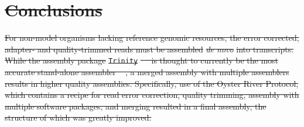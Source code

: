 \documentclass[10pt,letterpaper]{article}
\providecommand{\DIFdeltex}[1]{{\protect\color{red}\sout{#1}}}                      %
\providecommand{\DIFdel}[1]{\texorpdfstring{\DIFdeltex{#1}}{}} %
\begin{document}

\section{\DIFdel{Conclusions}}
\addtocounter{section}{-1}%

\DIFdel{For non-model organisms lacking reference genomic resources, the error corrected, adapter- and quality-trimmed reads must be assembled }\textit{\DIFdel{de novo}} %
\DIFdel{into transcripts. While the assembly package }\texttt{\DIFdel{Trinity}} %
\DIFdel{\mbox{%
\citep{Haas:2013jq} }%
is thought to currently be the most accurate stand-alone assembler \mbox{%
\citep{Li:2014cm}}%
, a merged assembly with multiple assemblers results in higher quality assemblies. Specifically, use of the Oyster River Protocol, which contains a recipe for read error correction, quality trimming, assembly with multiple software packages, and merging resulted in a final assembly, the structure of which was greatly improved. 
}%
\end{document}
